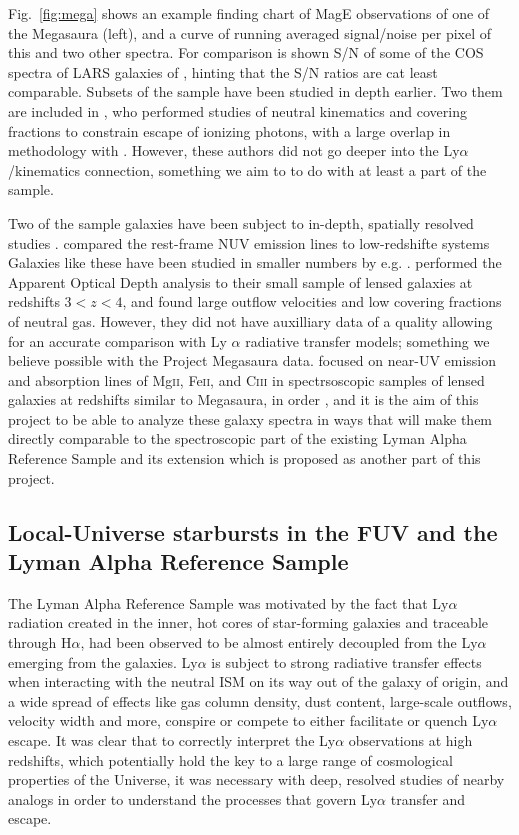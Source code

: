 \documentclass[12pt]{amsart}
\begin{document}
Fig.~\ref{fig:mega} shows an example finding chart of MagE observations of one
of the Megasaura (left), and a curve of running averaged signal/noise per pixel
of this and two other spectra. For comparison is shown S/N of some of the COS
spectra of LARS galaxies of \cite{RiveraThorsen2015}, hinting that the S/N
ratios are cat least comparable. Subsets of the sample have been studied in
depth earlier. Two them are included in \cite{Jones2013}, who performed
studies of neutral kinematics and covering fractions to constrain escape of
ionizing photons, with a large overlap in methodology with
\cite{RiveraThorsen2015,RiveraThorsen2017}. However, these authors did not go
deeper into the Ly$\alpha$/kinematics connection, something we aim to
to do with at least a part of the sample.


Two of the sample galaxies have been subject to in-depth, spatially resolved
studies \citep{Bayliss2014,Bordoloi2016}. \cite{Bayliss2014} compared the
rest-frame NUV emission lines to low-redshifte systems
Galaxies like these have
been studied in smaller numbers by e.g.
\cite{Jones2013,Rigby2014,Rigby2015,Bayliss2014,Bordoloi2016}. \cite{Jones2013}
performed the Apparent Optical Depth analysis to their small sample of lensed
galaxies at redshifts $3 < z < 4$, and found large outflow velocities and low
covering fractions of neutral gas. However, they did not have auxilliary data of
a quality allowing for an accurate comparison with Ly $\alpha$ radiative
transfer models; something we believe possible with the Project Megasaura data. 
\cite{Rigby2014,Rigby2015} focused on near-UV emission and absorption lines of
Mg\textsc{ii}, Fe\textsc{ii}, and C\textsc{iii} in spectrsoscopic samples of
lensed galaxies at redshifts similar to Megasaura, in order , and it is the aim
of this project to be able to analyze these galaxy spectra in ways that will
make them directly comparable to the spectroscopic part of the existing Lyman
Alpha Reference Sample \citep{RiveraThorsen2015} and its extension which is
proposed as another part of this project. 


\subsection{Local-Universe starbursts in the FUV and the Lyman Alpha Reference Sample}

The Lyman Alpha Reference Sample was motivated by the fact that Ly$\alpha$
radiation created in the inner, hot cores of star-forming galaxies and traceable
through H$\alpha$, had been observed to be almost entirely decoupled from the
Ly$\alpha$ emerging from the galaxies. Ly$\alpha$ is subject to strong radiative
transfer effects when  interacting with the neutral ISM on its way out of the
galaxy of origin, and a wide spread of effects like gas column density, dust content,
large-scale outflows, velocity width and more, conspire or compete to either
facilitate or quench Ly$\alpha$ escape.  It was clear that to correctly
interpret the Ly$\alpha$ observations at high redshifts, which potentially hold
the key to a large range of cosmological properties of the Universe, it was
necessary with deep, resolved studies of nearby analogs in order to understand
the processes that govern Ly$\alpha$ transfer and escape. 
\end{document}
